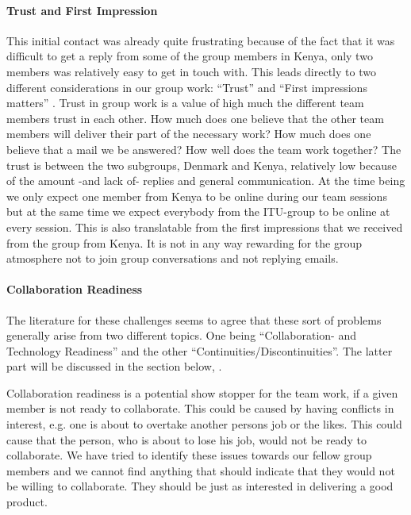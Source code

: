 \paragraph{Trust and First Impression} \label{par:trustandfirstimpressions}
This initial contact was already quite frustrating because of the fact that it was difficult to get a reply from some of the group members in Kenya, only two members was relatively easy to get in touch with. This leads directly to two different considerations in our group work: ``Trust'' and ``First impressions matters'' \cite{jarvenpaa1998communication}. Trust in group work is a value of high much the different team members trust in each other. How much does one believe that the other team members will deliver their part of the necessary work? How much does one believe that a mail we be answered? How well does the team work together? The trust is between the two subgroups, Denmark and Kenya, relatively low because of the amount -and lack of- replies and general communication. At the time being we only expect one member from Kenya to be online during our team sessions but at the same time we expect everybody from the ITU-group to be online at every session. This is also translatable from the first impressions that we received from the group from Kenya. It is not in any way rewarding for the group atmosphere not to join group conversations and not replying emails. 

\paragraph{Collaboration Readiness} \label{par:collaborationreadiness}
The literature for these challenges seems to agree that these sort of problems generally arise from two different topics. One being ``Collaboration- and Technology Readiness'' and the other ``Continuities/Discontinuities''. The latter part will be discussed in the section below, .

Collaboration readiness is a potential show stopper for the team work, if a given member is not ready to collaborate. This could be caused by having conflicts in interest, e.g. one is about to overtake another persons job or the likes. This could cause that the person, who is about to lose his job, would not be ready to collaborate. We have tried to identify these issues towards our fellow group members and we cannot find anything that should indicate that they would not be willing to collaborate. They should be just as interested in delivering a good product. 

